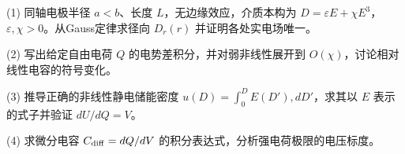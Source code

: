 (1) 同轴电极半径 \(a<b\)、长度 \(L\)，无边缘效应，介质本构为 \(D=\varepsilon E+\chi E^3\)，\(\varepsilon,\chi>0\)。从Gauss定律求径向 \(D_r(r)\) 并证明各处实电场唯一。

(2) 写出给定自由电荷 \(Q\) 的电势差积分，并对弱非线性展开到 \(O(\chi)\)，讨论相对线性电容的符号变化。

(3) 推导正确的非线性静电储能密度 \(u(D)=\int_0^D E(D'),dD'\)，求其以 \(E\) 表示的式子并验证 \(dU/dQ=V\)。

(4) 求微分电容 \(C_{\rm diff}=dQ/dV\) 的积分表达式，分析强电荷极限的电压标度。

